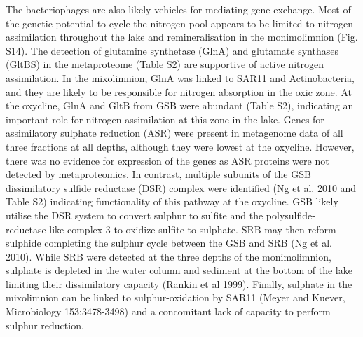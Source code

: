 The bacteriophages are also likely vehicles for mediating gene exchange.
Most of the genetic potential to cycle the nitrogen pool appears to be limited to nitrogen assimilation throughout the lake and remineralisation in the monimolimnion (Fig. S14). 
The detection of glutamine synthetase (GlnA) and glutamate synthases (GltBS) in the metaproteome (Table S2) are supportive of active nitrogen assimilation. 
In the mixolimnion, GlnA was linked to SAR11 and Actinobacteria, and they are likely to be responsible for nitrogen absorption in the oxic zone. At the oxycline, GlnA and GltB from GSB were abundant (Table S2), indicating an important role for nitrogen assimilation at this zone in the lake.
Genes for assimilatory sulphate reduction (ASR) were present in metagenome data of all three fractions at all depths, although they were lowest at the oxycline. 
However, there was no evidence for expression of the genes as ASR proteins were not detected by metaproteomics. In contrast, multiple subunits of the GSB dissimilatory sulfide reductase (DSR) complex were identified (Ng et al. 2010 and Table S2) indicating functionality of this pathway at the oxycline. 
\ac{GSB} likely utilise the DSR system to convert sulphur to sulfite and the polysulfide-reductase-like complex 3 to oxidize sulfite to sulphate. 
SRB may then reform sulphide completing the sulphur cycle between the \ac{GSB} and \ac{SRB} (Ng et al. 2010). 
While \ac{SRB} were detected at the three depths of the monimolimnion, sulphate is depleted in the water column and sediment at the bottom of the lake limiting their dissimilatory capacity (Rankin et al 1999). 
Finally, sulphate in the mixolimnion can be linked to sulphur-oxidation by SAR11 (Meyer and Kuever, Microbiology 153:3478-3498) and a concomitant lack of capacity to perform sulphur reduction. 


